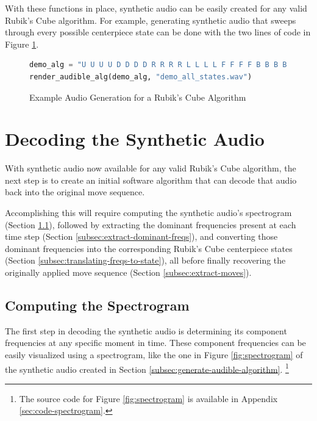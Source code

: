With these functions in place, synthetic audio can be easily created for any valid Rubik's Cube algorithm.
For example, generating synthetic audio that sweeps through every possible centerpiece state can be done with the two lines of code in Figure \ref{fig:example-alg-audio}.

\begin{figure}[h]
\caption{Example Audio Generation for a Rubik's Cube Algorithm}
\label{fig:example-alg-audio}
\begin{lstlisting}[language=Python]
demo_alg = "U U U U D D D D R R R R L L L L F F F F B B B B"
render_audible_alg(demo_alg, "demo_all_states.wav")
\end{lstlisting}
\end{figure}


\section{Decoding the Synthetic Audio}
\label{sec:decoding-synthetic-audio}
With synthetic audio now available for any valid Rubik's Cube algorithm, the next step is to create an initial software algorithm that can decode that audio back into the original move sequence.

Accomplishing this will require computing the synthetic audio's spectrogram (Section \ref{subsec:compute-spectrogram}), followed by extracting the dominant frequencies present at each time step (Section \ref{subsec:extract-dominant-freqs}), and converting those dominant frequencies into the corresponding Rubik's Cube centerpiece states (Section \ref{subsec:translating-freqs-to-state}), all before finally recovering the originally applied move sequence (Section \ref{subsec:extract-moves}).

\subsection{Computing the Spectrogram}
\label{subsec:compute-spectrogram}
The first step in decoding the synthetic audio is determining its component frequencies at any specific moment in time.
These component frequencies can be easily visualized using a spectrogram, like the one in Figure \ref{fig:spectrogram} of the synthetic audio created in Section \ref{subsec:generate-audible-algorithm}. \footnote{The source code for Figure \ref{fig:spectrogram} is available in Appendix \ref{sec:code-spectrogram}.}

